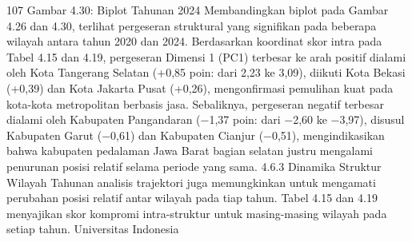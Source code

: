 107
Gambar 4.30: Biplot Tahunan 2024
Membandingkan biplot pada Gambar 4.26 dan 4.30, terlihat pergeseran struktural yang
signifikan pada beberapa wilayah antara tahun 2020 dan 2024. Berdasarkan koordinat
skor intra pada Tabel 4.15 dan 4.19, pergeseran Dimensi 1 (PC1) terbesar ke arah positif
dialami oleh Kota Tangerang Selatan (+0,85 poin: dari 2,23 ke 3,09), diikuti Kota
Bekasi (+0,39) dan Kota Jakarta Pusat (+0,26), mengonfirmasi pemulihan kuat pada
kota-kota metropolitan berbasis jasa. Sebaliknya, pergeseran negatif terbesar dialami oleh
Kabupaten Pangandaran (−1,37 poin: dari −2,60 ke −3,97), disusul Kabupaten Garut
(−0,61) dan Kabupaten Cianjur (−0,51), mengindikasikan bahwa kabupaten pedalaman
Jawa Barat bagian selatan justru mengalami penurunan posisi relatif selama periode yang
sama.
4.6.3 Dinamika Struktur Wilayah Tahunan
analisis trajektori juga memungkinkan untuk mengamati perubahan posisi relatif antarwilayah pada tiap tahun. Tabel 4.15 dan 4.19 menyajikan skor kompromi intra-struktur
untuk masing-masing wilayah pada setiap tahun.
Universitas Indonesia


